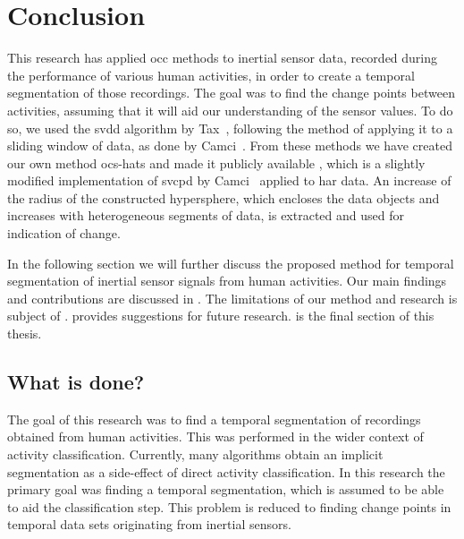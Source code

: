 
\chapter{Conclusion}

\label{Chapter7} %


This research has applied \gls{occ} methods to inertial sensor data, recorded during the performance of various human activities, in order to create a temporal segmentation of those recordings.
The goal was to find the change points between activities, assuming that it will aid our understanding of the sensor values.
To do so, we used the \gls{svdd} algorithm by Tax~\cite{tax1999support}, following the method of applying it to a sliding window of data, as done by Camci~\cite{camci2010change}.
From these methods we have created our own method \gls{ocs-hats} and made it publicly available \cite{vlasveld2014hats}, which is a slightly modified implementation of \gls{svcpd} by Camci~\cite{camci2010change} applied to \gls{har} data.
An increase of the radius of the constructed hypersphere, which encloses the data objects and increases with heterogeneous segments of data, is extracted and used for indication of change.

In the following section we will further discuss the proposed method for temporal segmentation of inertial sensor signals from human activities.
Our main findings and contributions are discussed in .
The limitations of our method and research is subject of .
 provides suggestions for future research.
 is the final section of this thesis.

\section{What is done?}
The goal of this research was to find a temporal segmentation of recordings obtained from human activities.
This was performed in the wider context of activity classification.
Currently, many algorithms obtain an implicit segmentation as a side-effect of direct activity classification.
In this research the primary goal was finding a temporal segmentation, which is assumed to be able to aid the classification step.
This problem is reduced to finding change points in temporal data sets originating from inertial sensors.

